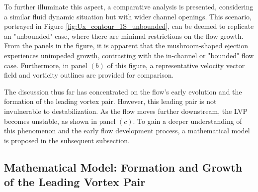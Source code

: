 \documentclass[final,3p,10pt,times,review,authoryear]{elsarticle}
\begin{document}
	To further illuminate this aspect, a comparative analysis is presented, considering a similar fluid dynamic situation but with wider channel openings. This scenario, portrayed in Figure \ref{fig:Ux_contour_1S_unbounded}, can be deemed to replicate an "unbounded" case, where there are minimal restrictions on the flow growth. From the panels in the figure, it is apparent that the mushroom-shaped ejection experiences unimpeded growth, contrasting with the in-channel or "bounded" flow case. Furthermore, in panel $(b)$ of this figure, a representative velocity vector field and vorticity outlines are provided for comparison.
	
	The discussion thus far has concentrated on the flow's early evolution and the formation of the leading vortex pair. However, this leading pair is not invulnerable to destabilization. As the flow moves further downstream, the LVP becomes unstable, as shown in panel $(c)$. To gain a deeper understanding of this phenomenon and the early flow development process, a mathematical model is proposed in the subsequent subsection.
	
	\subsection{Mathematical Model: Formation and Growth of the Leading Vortex Pair}\label{sec:model}
	
\end{document}
